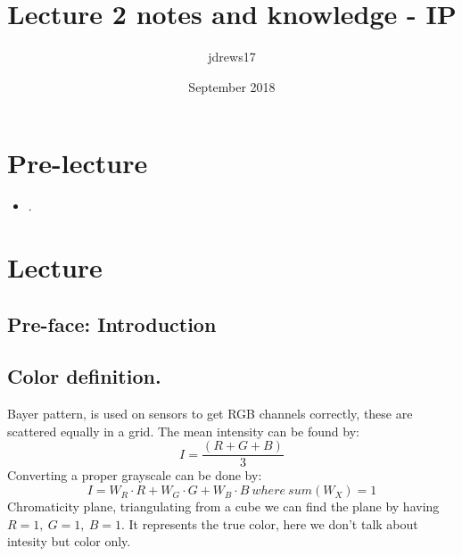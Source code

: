 \documentclass{article}
\title{Lecture 2 notes and knowledge - IP}
\author{jdrews17}
\date{September 2018}
\begin{document}
\maketitle
\newpage

\section{Pre-lecture}
\begin{itemize}
  \item .
\end{itemize}

\section{Lecture}
\subsection{Pre-face: Introduction}

\subsection{Color definition.}
Bayer pattern, is used on sensors to get RGB channels correctly, these are scattered equally in a grid.
The mean intensity can be found by: $$I = \frac{(R+G+B)}{3} $$
Converting a proper grayscale can be done by: $$ I = W_R \cdot R + W_G \cdot G + W_B \cdot B \ where \ sum(W_X) = 1$$
Chromaticity plane, triangulating from a cube we can find the plane by having $R = 1,\ G = 1,\ B = 1$. It represents the true color, here we don't talk about intesity but color only.\\
\end{document}
